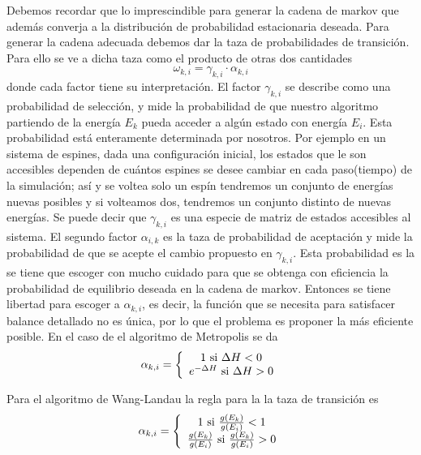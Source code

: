 \documentclass[12pt]{book}
\begin{document}
Debemos recordar que lo imprescindible para generar la cadena de markov que además converja a la distribución de probabilidad estacionaria deseada. Para generar la cadena adecuada debemos dar la taza de probabilidades de transición. Para ello se ve a dicha taza como el producto de otras dos cantidades
\begin{equation}
\omega_{k,i}=\gamma_{k,i}\cdot  \alpha_{k,i}
\end{equation}
donde cada factor tiene su interpretación. El factor $\gamma_{k,i}$ se describe como una probabilidad de selección, y mide la probabilidad de que nuestro algoritmo partiendo de la energía $E_{k}$ pueda acceder a algún estado con energía $E_{i}$. Esta probabilidad está enteramente determinada por nosotros. Por ejemplo en un sistema de espines, dada una configuración inicial, los estados que le son accesibles  dependen de cuántos espines se desee cambiar en cada paso(tiempo) de la simulación; así y se voltea solo un espín tendremos un conjunto de energías nuevas posibles y si volteamos dos, tendremos un conjunto distinto de nuevas energías. Se puede decir que $\gamma_{k,i}$ es una especie de matriz de estados accesibles al sistema. El segundo factor $\alpha_{i,k}$ es la taza de probabilidad de aceptación y mide la probabilidad de que se acepte el cambio propuesto en $\gamma_{k,i}$. Esta probabilidad es la se tiene que escoger con mucho cuidado para que se obtenga con eficiencia la probabilidad de equilibrio deseada en la cadena de markov. Entonces se tiene libertad para escoger a $\alpha_{k,i}$, es decir, la función que se necesita para satisfacer balance detallado no es única, por lo que el problema es proponer la más eficiente posible. En el caso de el algoritmo de Metropolis se da 
\begin{equation}
	\alpha_{k,i}=\left\{
\begin{array}{c l}
 1 \text{ si } \Delta H < 0\\
 e^{-\Delta H} \text{ si } \Delta H > 0\\
\end{array}
\right.
\end{equation}

Para el algoritmo de Wang-Landau la regla para la la taza de transición es
\begin{equation}
	\alpha_{k,i}=\left\{
\begin{array}{c l}
1 \text{ si } \frac{g(E_{k})}{g(E_{i})} < 1\\
\frac{g(E_{k})}{g(E_{i})} \text{ si } \frac{g(E_{k})}{g(E_{i})} > 0\\
\end{array}
\right.
\end{equation}
\\
\end{document}
